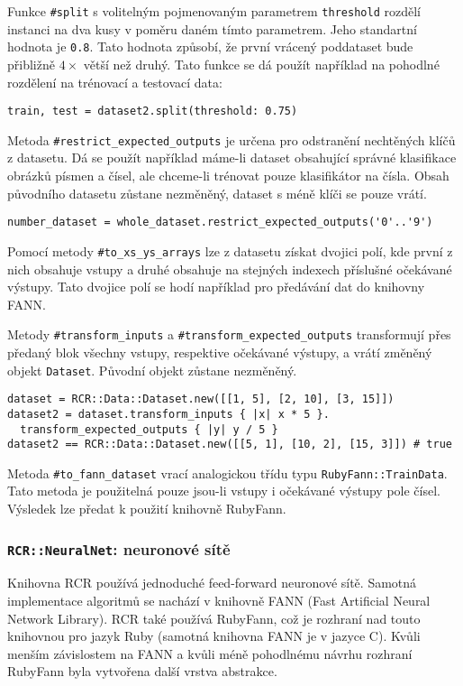 \documentclass[a4paper]{article}
\begin{document}
Funkce \texttt{\#split} s volitelným pojmenovaným parametrem \texttt{threshold}
rozdělí instanci na dva kusy v poměru daném tímto parametrem. Jeho standartní
hodnota je \texttt{0.8}. Tato hodnota způsobí, že první vrácený poddataset bude
přibližně $4\times$ větší než druhý.
Tato funkce se dá použít například na pohodlné rozdělení na trénovací a
testovací data:
\begin{lstlisting}
train, test = dataset2.split(threshold: 0.75)
\end{lstlisting}

Metoda \texttt{\#restrict\_expected\_outputs} je určena pro odstranění nechtěných klíčů
z datasetu. Dá se použít například máme-li dataset obsahující správné klasifikace
obrázků písmen a čísel, ale chceme-li trénovat pouze klasifikátor na čísla.
Obsah původního datasetu zůstane nezměněný, dataset s méně klíči se pouze vrátí.
\begin{lstlisting}
number_dataset = whole_dataset.restrict_expected_outputs('0'..'9')
\end{lstlisting}

Pomocí metody \texttt{\#to\_xs\_ys\_arrays} lze z datasetu získat dvojici polí,
kde první z nich obsahuje vstupy a druhé obsahuje na stejných indexech příslušné
očekávané výstupy. Tato dvojice polí se hodí například pro předávání dat do
knihovny FANN.

Metody \texttt{\#transform\_inputs} a \texttt{\#transform\_expected\_outputs} transformují
přes předaný blok všechny vstupy, respektive očekávané výstupy, a vrátí změněný
objekt \texttt{Dataset}. Původní objekt zůstane nezměněný.
\begin{lstlisting}
dataset = RCR::Data::Dataset.new([[1, 5], [2, 10], [3, 15]])
dataset2 = dataset.transform_inputs { |x| x * 5 }.
  transform_expected_outputs { |y| y / 5 }
dataset2 == RCR::Data::Dataset.new([[5, 1], [10, 2], [15, 3]]) # true
\end{lstlisting}

Metoda \texttt{\#to\_fann\_dataset} vrací analogickou třídu typu
\texttt{RubyFann::TrainData}. Tato metoda je použitelná pouze jsou-li vstupy i
očekávané výstupy pole čísel. Výsledek lze předat k použití knihovně RubyFann.

\subsubsection{\texttt{RCR::NeuralNet}: neuronové sítě}
Knihovna RCR používá jednoduché feed-forward neuronové sítě. Samotná
implementace algoritmů se nachází v knihovně FANN (Fast Artificial Neural %
Network Library). RCR také používá RubyFann, což je rozhraní nad touto knihovnou
pro jazyk Ruby (samotná knihovna FANN je v jazyce C). Kvůli menším závislostem
na FANN a kvůli méně pohodlnému návrhu rozhraní RubyFann byla vytvořena další
vrstva abstrakce.
\end{document}
